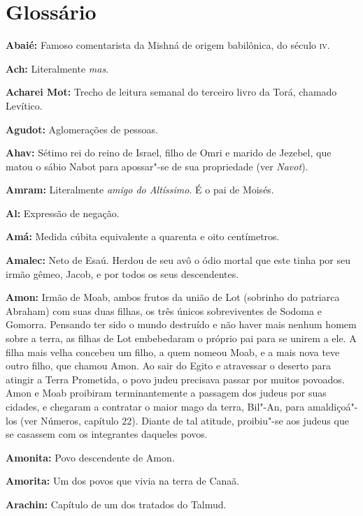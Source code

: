 \setcounter{secnumdepth}{-2}

\chapter{Glossário}

\begin{hangparas}{.25in}{1}
{\small

\textbf{Abaié:} Famoso comentarista da Mishná de origem babilônica, do
século \textsc{iv}.

\textbf{Ach:} Literalmente \emph{mas}.

\textbf{Acharei Mot:} Trecho de leitura semanal do terceiro livro da Torá, chamado Levítico.

\textbf{Agudot:} Aglomerações de pessoas.

\textbf{Ahav:} Sétimo rei do reino de Israel, filho de Omri e marido de Jezebel, que matou o sábio Nabot para apossar"-se de sua propriedade (ver \emph{Navot}).

\textbf{Amram:} Literalmente \emph{amigo do Altíssimo}. É o pai de Moisés.

\textbf{Al:} Expressão de negação.

\textbf{Amá:} Medida cúbita equivalente a quarenta e oito centímetros.

\textbf{Amalec:} Neto de Esaú. Herdou de seu avô o ódio mortal que
este tinha por seu irmão gêmeo, Jacob, e por todos os seus
descendentes.

\textbf{Amon:} Irmão de Moab, ambos frutos da união de Lot (sobrinho do
patriarca Abraham) com suas duas filhas, os três únicos sobreviventes
de Sodoma e Gomorra. Pensando ter sido o mundo destruído e não haver
mais nenhum homem sobre a terra, as filhas de Lot embebedaram o próprio
pai para se unirem a ele. A filha mais velha concebeu um
filho, a quem nomeou Moab, e a mais nova teve outro filho, que
chamou Amon. Ao sair do Egito e atravessar o deserto para atingir a
Terra Prometida, o povo judeu precisava passar por muitos povoados.
Amon e Moab proibiram terminantemente a passagem dos judeus por suas
cidades, e chegaram a contratar o maior mago da terra, Bil"-An, para
amaldiçoá"-los (ver Números, capítulo 22). Diante de tal
atitude, proibiu"-se aos judeus que se casassem com os integrantes
daqueles povos.

\textbf{Amonita:} Povo descendente de Amon.

\textbf{Amorita:} Um dos povos que vivia na terra de Canaã.

\textbf{Arachin:} Capítulo de um dos tratados do Talmud.

}
\end{hangparas}
